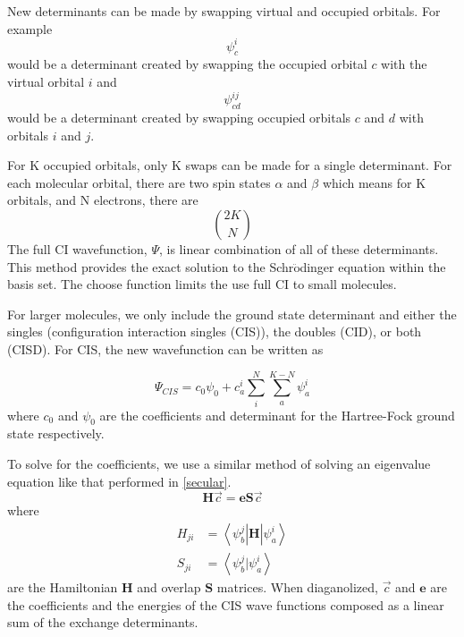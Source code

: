 	New determinants can be made by swapping virtual and occupied orbitals.
	For example
	\begin{equation}
	  \psi_c^i
	\end{equation}
	would be a determinant created by swapping the occupied orbital \(c\) with the virtual orbital \(i\) and
	\begin{equation}
	  \psi_{cd}^{ij}
	\end{equation}
	would be a determinant created by swapping occupied orbitals \(c\) and \(d\) with orbitals \(i\) and \(j\).

	For K occupied orbitals, only K swaps can be made for a single determinant.
	For each molecular orbital, there are two spin states \(\alpha\) and \(\beta\) which means for K orbitals, and N electrons, there are
	\begin{equation}
	  2K \choose N
	\end{equation}
	The full CI wavefunction, \(\Psi\), is linear combination of all of these determinants.
This method provides the exact solution to the Schr\(\ddot{\text{o}}\)dinger equation within the basis set.
	The choose function limits the use full CI to small molecules.

	For larger molecules, we only include the ground state determinant and either the singles (configuration interaction singles (CIS)), the doubles (CID), or both (CISD).
	For CIS, the new wavefunction can be written as

	\begin{equation}
	\Psi_{CIS} = c_0\psi_0 + c_a^i\sum_i^N\sum_a^{K-N}\psi_a^i
	\end{equation}
	where \(c_0\) and \(\psi_0\) are the coefficients and determinant for the Hartree-Fock ground state respectively.

	To solve for the coefficients, we use a similar method of solving an eigenvalue equation like that performed in \ref{secular}.
	\begin{equation}\label{eq:CIS}
	  \bm{H}\vec{c} = \bm{e} \bm{S} \vec{c}
	\end{equation}
	where
	\begin{align}
	  H_{ji} &= \left<\psi_b^j \right| \bm{H} \left| \psi_a^i \right> \label{eq:CISMatrix}\\
	  S_{ji} &= \left<\psi_b^j | \psi_a^i \right>
	\end{align}
	are the Hamiltonian \(\bm{H}\) and overlap \(\bm{S}\) matrices.
	When diaganolized, \(\vec{c}\) and \(\bm{e}\) are the coefficients and the energies of the CIS wave functions composed as a linear sum of the exchange determinants.

